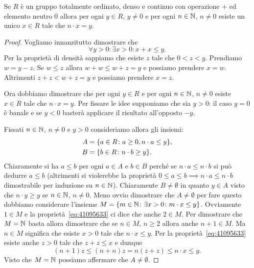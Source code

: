 \begin{theorem}[divisibilità]
  \label{th:divisibile}%
Se $R$ è un gruppo totalmente ordinato, denso e continuo
con operazione $+$ ed elemento neutro $0$
allora per ogni $y\in R$, $y\neq 0$ e per ogni $n\in {\mathbb N}$, $n\neq 0$ 
esiste un unico $x\in R$ tale che $n\cdot x = y$.
\end{theorem}
\begin{proof}
Vogliamo innanzitutto dimostrare che 
\begin{equation}\label{eq:41095633}
  \forall y>0 \colon \exists x>0 \colon x+x \le y.
\end{equation}
Per la proprietà di densità sappiamo che esiste $z$ tale che 
$0<z<y$. 
Prendiamo $w=y-z$. Se $w\le z$ allora $w+w\le w+z=y$ e possiamo prendere $x=w$.
Altrimenti $z+z < w+z = y$ e possiamo prendere $x=z$.

Ora dobbiamo dimostrare che per ogni $y\in R$ e per ogni $n\in {\mathbb N}$, $n\neq 0$
esiste $x\in R$ tale che $n\cdot x=y$.
Per fissare le idee supponiamo che sia $y>0$: il caso $y=0$ è banale 
e se $y<0$ basterà applicare il risultato all'opposto $-y$.

Fissati $n\in {\mathbb N}$, $n\neq 0$ e $y>0$ 
consideriamo allora gli insiemi:
\begin{align*}
  A &= {\left\{ a\in R\colon a\ge 0, n\cdot a\le y \right\}},\\
  B &= {\left\{ b\in R\colon n\cdot b\ge y \right\}}.
\end{align*}
Chiaramente si ha $a\le b$ per ogni $a\in A$ e $b\in B$ 
perché se $n\cdot a \le n\cdot b$ 
si può dedurre $a\le b$ (altrimenti si violerebbe
la proprietà $0\le a\le b \implies n\cdot a\le n\cdot b$ dimostrabile 
per induzione su $n\in {\mathbb N}$).
Chiaramente $B\neq \emptyset$ in quanto $y\in A$ visto che $n\cdot y\ge y$ se 
$n\in {\mathbb N}$, $n\neq 0$.
Meno ovvio dimostrare che $A\neq \emptyset$ per fare questo
dobbiamo considerare l'insieme 
$M={\left\{ m\in{\mathbb N}\colon \exists x>0\colon m\cdot x\le y \right\}}$.
Ovviamente $1\in M$ e la proprietà~\eqref{eq:41095633}
ci dice che anche $2\in M$. 
Per dimostrare che $M={\mathbb N}$ basta allora dimostrare che 
se $n\in M$, $n\ge 2$ allora anche $n+1\in M$. 
Ma $n\in M$ significa che esiste $x>0$ tale che 
$n\cdot x\le y$. 
Per la proprietà~\eqref{eq:41095633} esiste anche $z>0$ 
tale che $z+z\le x$ e dunque 
\[
  (n+1)z \le (n+n)z = n(z+z)\le n\cdot x \le y.
\]
Visto che $M = {\mathbb N}$ possiamo affermare che $A\neq \emptyset$.


\end{proof}
